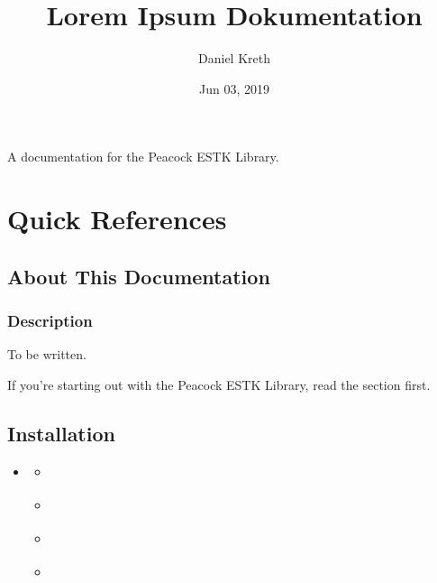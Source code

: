 \documentclass[a4paper,11pt,openany,oneside,english]{sphinxmanual}
\title{Lorem Ipsum Dokumentation}
\date{Jun 03, 2019}
\author{Daniel Kreth}
\begin{document}
\pagestyle{empty}
\sphinxmaketitle
\pagestyle{plain}
\sphinxtableofcontents
\pagestyle{normal}
\label{\detokenize{index::doc}}


A documentation for the Peacock ESTK Library.


\chapter{Quick References}
\label{\detokenize{index:quick-references}}

\section{About This Documentation}
\label{\detokenize{intro:about-this-documentation}}\label{\detokenize{intro::doc}}

\subsection{Description}
\label{\detokenize{intro:description}}
To be written.

If you’re starting out with the Peacock ESTK Library,
read the {\hyperref[\detokenize{getting_started/getting_started::doc}]{}} section first.


\section{Installation}
\label{\detokenize{getting_started/install:installation}}\label{\detokenize{getting_started/install::doc}}
\begin{sphinxShadowBox}
\begin{itemize}
\item {} 
\label{\detokenize{getting_started/install:id1}}{\hyperref[\detokenize{getting_started/install:installation}]{}}
\begin{itemize}
\item {} 
\label{\detokenize{getting_started/install:id2}}{\hyperref[\detokenize{getting_started/install:install-instructions}]{}}

\item {} 
\label{\detokenize{getting_started/install:id3}}{\hyperref[\detokenize{getting_started/install:after-effects-script-folder}]{}}

\item {} 
\label{\detokenize{getting_started/install:id4}}{\hyperref[\detokenize{getting_started/install:appdata}]{}}

\item {} 
\label{\detokenize{getting_started/install:id5}}{\hyperref[\detokenize{getting_started/install:userdata}]{}}

\end{itemize}

\end{itemize}
\end{sphinxShadowBox}
\end{document}
